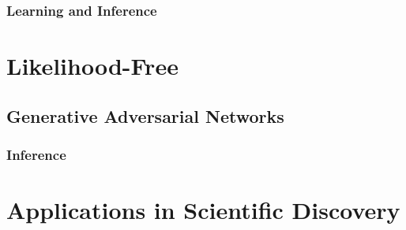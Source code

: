 			\subsubsection{Learning and Inference} %

	\section{Likelihood-Free} %

		\subsection{Generative Adversarial Networks} %

			\subsubsection{Inference} %

	\section{Applications in Scientific Discovery} %
